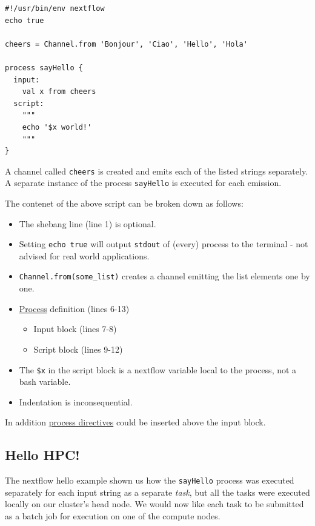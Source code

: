 \begin{lstlisting}
#!/usr/bin/env nextflow
echo true 

cheers = Channel.from 'Bonjour', 'Ciao', 'Hello', 'Hola'

process sayHello {
  input: 
    val x from cheers
  script:
    """
    echo '$x world!'
    """
}
\end{lstlisting}



A channel called \texttt{cheers} is created and emits each of the listed strings separately. 
A separate instance of the process \texttt{sayHello} is executed for each emission. 

\begin{note}
The contenet of the above script can be broken down as follows:
\begin{itemize}
  \item The shebang line (line 1) is optional.
  \item Setting \texttt{echo true} will output \texttt{stdout} of (every) process to the terminal - not advised for real world applications.
  \item \texttt{Channel.from(some\_list)} creates a channel emitting the list elements one by one.
  \item \href{https://www.nextflow.io/docs/latest/process.html}{Process} definition (lines 6-13)
  \begin{itemize}
    \item Input block (lines 7-8)
    \item Script block (lines 9-12)
  \end{itemize}
  \item The \texttt{\$x} in the script block is a nextflow variable local to the process, not a bash variable.
  \item Indentation is inconsequential. 
\end{itemize}
In addition \href{https://www.nextflow.io/docs/latest/process.html#directives}{process directives} could be inserted above the input block.
\end{note}


\subsection{Hello HPC!}

The nextflow hello example shown us how the \texttt{sayHello} process was executed separately for each input string as a separate \emph{task}, but all the tasks were executed locally on our cluster's head node. 
We would now like each task to be submitted as a batch job for execution on one of the compute nodes.

